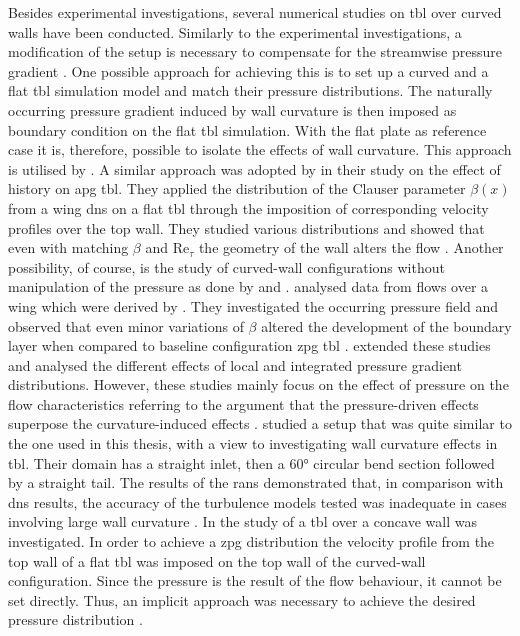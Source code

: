 Besides experimental investigations, several numerical studies on \acrshort{tbl} over curved walls have been conducted. 
Similarly to the experimental investigations, a modification of the setup is necessary to compensate for the streamwise pressure gradient \citep{appelbaum_systematic_2025}. 
One possible approach for achieving this is to set up a curved and a flat \acrshort{tbl} simulation model and match their pressure distributions.
The naturally occurring pressure gradient induced by wall curvature is then imposed as boundary condition on the flat \acrshort{tbl} simulation.
With the flat plate as reference case it is, therefore, possible to isolate the effects of wall curvature.
This approach is utilised by \citet{spalart_direct_2024,pargal_adverse-pressure-gradient_2022}.
A similar approach was adopted by \citet{bobke_history_2017} in their study on the effect of history on \acrshort{apg} \acrshort{tbl}.
They applied the distribution of the Clauser parameter $\beta(x)$ from a wing \acrshort{dns} on a flat \acrshort{tbl} through the imposition of corresponding velocity profiles over the top wall.
They studied various distributions and showed that even with matching $\beta$ and $\mathrm{Re}_{\tau}$ the geometry of the wall alters the flow \citep{bobke_history_2017}.
Another possibility, of course, is the study of curved-wall configurations without manipulation of the pressure as done by \citet{vinuesa_pressure-gradient_2017} and \citet{tanarro_effect_2020}.
\citet{vinuesa_pressure-gradient_2017} analysed data from flows over a wing which were derived by \citet{hosseini_direct_2016}.
They investigated the occurring pressure field and observed that even minor variations of $\beta$ altered the development of the boundary layer when compared to baseline configuration \acrshort{zpg} \acrshort{tbl} \citep{vinuesa_pressure-gradient_2017}.
\citet{tanarro_effect_2020} extended these studies and analysed the different effects of local and integrated pressure gradient distributions.
However, these studies mainly focus on the effect of pressure on the flow characteristics referring to the argument that the pressure-driven effects superpose the curvature-induced effects \citep{patel_longitudinal_1997}.
\citet{yang_assessment_2016} studied a setup that was quite similar to the one used in this thesis, with a view to investigating wall curvature effects in \acrshort{tbl}. 
Their domain has a straight inlet, then a 60° circular bend section followed by a straight tail.
The results of the \acrshort{rans} demonstrated that, in comparison with \acrshort{dns} results, the accuracy of the turbulence models tested was inadequate in cases involving large wall curvature \citep{yang_assessment_2016}.
In the study of \citep{appelbaum_systematic_2025} a \acrshort{tbl} over a concave wall was investigated. 
In order to achieve a \acrshort{zpg} distribution the velocity profile from the top wall of a flat \acrshort{tbl} was imposed on the top wall of the curved-wall configuration.
Since the pressure is the result of the flow behaviour, it cannot be set directly. Thus, an implicit approach was necessary to achieve the desired pressure distribution \citep{appelbaum_systematic_2025}.

